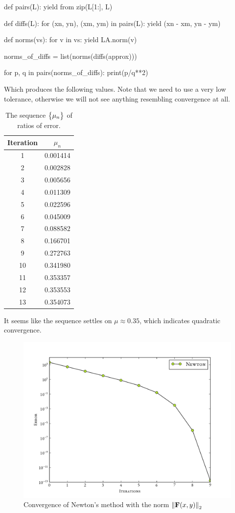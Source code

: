 \documentclass[12pt]{article}
\begin{document}
\begin{multicols}{2}
\begin{python}[
        caption={Computing the sequence of ratios}
    ]
def pairs(L):
    yield from zip(L[1:], L)

def diffs(L):
    for (xn, yn), (xm, ym) in pairs(L):
        yield (xn - xm, yn - ym)

def norms(vs):
        for v in vs: yield LA.norm(v)

norms_of_diffs = list(norms(diffs(approx)))

for p, q in pairs(norms_of_diffs):
    print(p/q**2)
    \end{python}
Which produces the following values.
Note that we need to use a very low tolerance,
otherwise we will not see anything resembling convergence at all.
    \begin{table}[H]
        \centering
        \caption{The sequence $\Seq{\mu_n}$ of ratios of error.}
        \begin{tabular}{c S[table-format=1.6]}
            \hline\hline
            \bfseries Iteration & $\mu_n$ \\
              & 0.001414\\
            2  & 0.002828\\
            3  & 0.005656\\
            4  & 0.011309\\
            5  & 0.022596\\
            6  & 0.045009\\
            7  & 0.088582\\
            8  & 0.166701\\
            9  & 0.272763\\
            10 & 0.341980\\
            11 & 0.353357\\
            12 & 0.353553\\
            13 & 0.354073\\
            \hline
        \end{tabular}
    \end{table}\noindent
    It seems like the sequence settles on $\mu \approx 0.35$,
    which indicates quadratic convergence.
    \begin{figure}[H]
        \centering
        \includegraphics[width=0.75\columnwidth]{f_norms}
        \caption{
            Convergence of Newton's method with the norm $\Norm[2]{\vec F(x, y)}$
        }
        \label{fig:f_norms}
    \end{figure}\noindent


\end{multicols}
\end{document}

